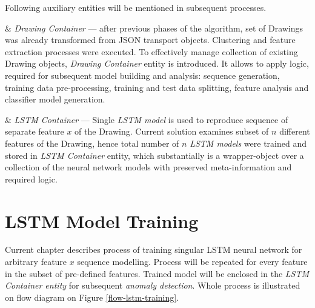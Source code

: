 \begin{easylist}

Following auxiliary entities will be mentioned in subsequent processes.

& \textit{Drawing Container} --- after previous phases of the algorithm, set of Drawings was already transformed from JSON transport objects. Clustering and feature extraction processes were executed. To effectively manage collection of existing Drawing objects, \textit{Drawing Container} entity is introduced. It allows to apply logic, required for subsequent model building and analysis: sequence generation, training data pre-processing, training and test data splitting, feature analysis and classifier model generation. 

& \textit{LSTM Container} --- Single \textit{LSTM model} is used to reproduce sequence of separate feature $x$ of the Drawing. Current solution examines subset of $n$ different features of the Drawing, hence total number of $n$ \textit{LSTM models} were trained and stored in \textit{LSTM Container} entity, which substantially is a wrapper-object over a collection of the neural network models with preserved meta-information and required logic.

\end{easylist}

\section{LSTM Model Training}

Current chapter describes process of training singular LSTM neural network for arbitrary feature $x$ sequence modelling. Process will be repeated for every feature in the subset of pre-defined features. Trained model will be enclosed in the \textit{LSTM Container entity} for subsequent \textit{anomaly detection}. Whole process is illustrated on flow diagram on Figure \ref{flow-lstm-training}.


